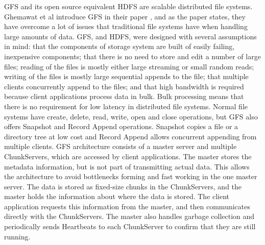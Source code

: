 \documentclass{article}
\theoremstyle{definition}
\begin{document}
GFS and its open source equivalent HDFS are scalable distributed file systems. Ghemawat et al introduce GFS in their paper \cite{Ghemawat2003}, and as the paper states, they have overcome a lot of issues that traditional file systems have when handling large amounts of data. GFS, and HDFS, were designed with several assumptions in mind: that the components of storage system are built of easily failing, inexpensive components; that there is no need to store and edit a number of large files; reading of the files is mostly either large streaming or small random reads; writing of the files is mostly large sequential appends to the file; that multiple clients concurrently append to the files; and that high bandwidth is required because client applications process data in bulk. Bulk processing means that there is no requirement for low latency in distributed file systems. Normal file systems have create, delete, read, write, open and close operations, but GFS also offers Snapshot and Record Append operations. Snapshot copies a file or a directory tree at low cost and Record Append allows concurrent appending from multiple clients.   
GFS architecture consists of a master server and multiple ChunkServers, which are accessed by client applications. The master stores the metadata information, but is not part of transmitting actual data. This allows the architecture to avoid bottlenecks forming and fast working in the one master server. The data is stored as fixed-size chunks in the ChunkServers, and the master holds the information about where the data is stored. The client application requests this information from the master, and then communicates directly with the ChunkServers. The master also handles garbage collection and periodically sends Heartbeats to each ChunkServer to confirm that they are still running.  \\
\end{document}
